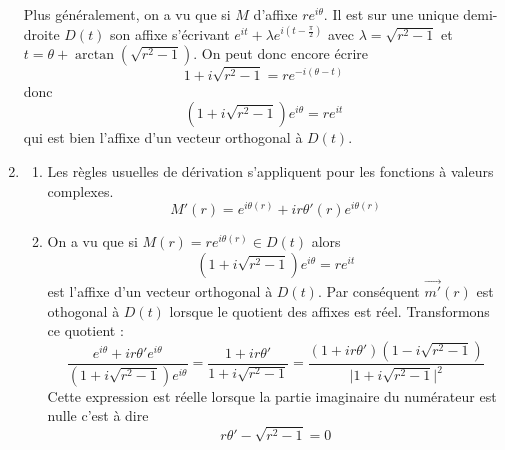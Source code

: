 \begin{enumerate}
Plus généralement, on a vu que si $M$ d'affixe $re^{i\theta}$. Il est sur une unique demi-droite $D(t)$ son affixe s'écrivant
$e^{it}+\lambda e^{i(t-\frac{\pi}{2})}$ avec $\lambda=\sqrt{r^2 -1}$ et $t= \theta + \arctan(\sqrt{r^2-1})$.
On peut donc encore écrire
\[1+i\sqrt{r^2-1}=re^{-i(\theta-t)}\]
donc
\[(1+i\sqrt{r^2-1})e^{i\theta}=re^{it}\]
qui est bien l'affixe d'un vecteur orthogonal à $D(t)$.
\item
\begin{enumerate}
\item Les règles usuelles de dérivation s'appliquent pour les fonctions à valeurs complexes.
\[M'(r)=e^{i\theta(r)}+ir\theta'(r)e^{i\theta(r)}\]
\item On a vu que si $M(r)=re^{i\theta(r)} \in D(t)$ alors
\[(1+i\sqrt{r^2-1})e^{i\theta}=re^{it}\]
est l'affixe d'un vecteur orthogonal à $D(t)$. Par conséquent $\overrightarrow{m'}(r)$ est othogonal à $D(t)$ lorsque le quotient des affixes est réel. Transformons ce quotient :
\begin{displaymath}
\frac{e^{i\theta}+ir\theta'e^{i\theta}}{(1+i\sqrt{r^2-1})e^{i\theta}}=
\frac{1+ir\theta'}{1+i\sqrt{r^2-1}}=
\frac{(1+ir\theta')(1-i\sqrt{r^2-1})}{\vert 1+i\sqrt{r^2-1}\vert^2} 
\end{displaymath}
Cette expression est réelle lorsque la partie imaginaire du numérateur est nulle c'est à dire
\[r\theta'- \sqrt{r^2-1}=0\]
\end{enumerate}
\end{enumerate}

